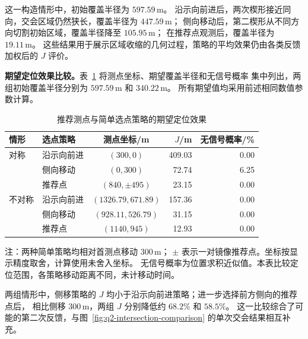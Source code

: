 \documentclass[UTF8,a4paper,12pt]{ctexart}
\begin{document}
\begin{samepage}
这一构造情形中，初始覆盖半径为 $597.59\,\mathrm m$。
沿示向前进后，两次楔形接近同向，交会区域仍然狭长，覆盖半径为 $447.59\,\mathrm m$；
侧向移动后，第二楔形从不同方向切割初始区域，覆盖半径降至 $105.95\,\mathrm m$；
在推荐点观测后，覆盖半径为 $19.11\,\mathrm m$。
这些结果用于展示区域收缩的几何过程，策略的平均效果仍由各类反馈加权后的 $J$ 评价。
\par
\end{samepage}

\textbf{期望定位效果比较。}表~\ref{tab:q2-baselines} 将测点坐标、期望覆盖半径和无信号概率
集中列出，两组初始覆盖半径分别为 $597.59\,\mathrm m$ 和 $340.22\,\mathrm m$。
所有期望值均采用前述相同数值参数计算。

\begin{table}[!htb]
  \centering
  \caption{推荐测点与简单选点策略的期望定位效果}
  \label{tab:q2-recommendations}
  \label{tab:q2-baselines}
  \small
  \setlength{\tabcolsep}{5pt}
  \renewcommand{\arraystretch}{1.15}
  \begin{tabular}{llcrr}
    \toprule
    情形 & 选点策略 & 测点坐标/m & $J$/m & 无信号概率/\% \\
    \midrule
    对称 & 沿示向前进 & $(300,0)$ & 409.03 & 0.00 \\
         & 侧向移动 & $(0,300)$ & 72.74 & 6.25 \\
         & 推荐点 & $(840,\pm495)$ & 23.15 & 0.00 \\
    \midrule
    不对称 & 沿示向前进 & $(1326.79,671.89)$ & 157.36 & 0.00 \\
           & 侧向移动 & $(928.11,526.79)$ & 31.15 & 0.00 \\
           & 推荐点 & $(1140,945)$ & 12.93 & 0.00 \\
    \bottomrule
  \end{tabular}
  \par\smallskip
  \parbox{0.96\linewidth}{\footnotesize 注：两种简单策略均相对首测点移动 $300\,\mathrm m$；
  $\pm$ 表示一对镜像推荐点。坐标按显示精度取舍，计算使用未舍入坐标。
  无信号概率为位置求积近似值。本表比较定位范围，各策略移动距离不同，未计移动时间。}
\end{table}

两组情形中，侧移策略的 $J$ 均小于沿示向前进策略；进一步选择前方侧向的推荐点后，
相比侧移 $300\,\mathrm m$，两组 $J$ 分别降低约 $68.2\%$ 和 $58.5\%$。
这一比较综合了可能的第二次反馈，与图~\ref{fig:q2-intersection-comparison} 的单次交会结果相互补充。
\end{document}
